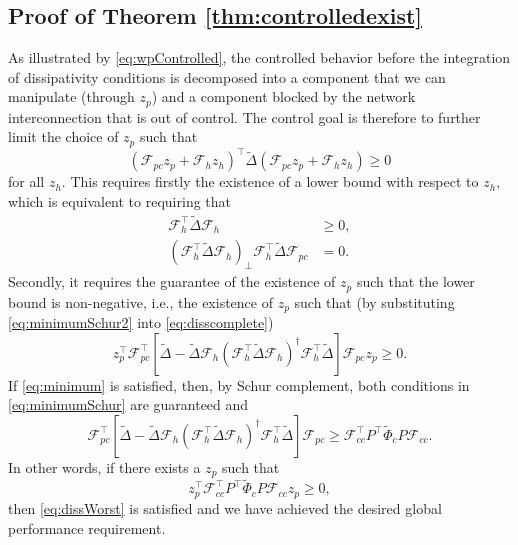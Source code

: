 \documentclass[11pt,print,draftcls,onecolumn,romanappendices]{ieeecolor}
\newcommand{\revise}[1]{{\color{black} #1}}
\newcommand{\F}{\mathcal{F}}
\begin{document}
\subsection{Proof of Theorem \ref{thm:controlledexist}}\label{appx:proofthm:controlledexist}
\revise{As illustrated by \eqref{eq:wpControlled}, the controlled behavior before the integration of dissipativity conditions is decomposed into a component that we can manipulate (through $z_p$) and a component blocked by the network interconnection that is out of control. The control goal is therefore to further limit the choice of $z_p$ such that
\begin{equation}\label{eq:disscomplete}
    (\F_{pc}z_p+\F_hz_h)^\top\widetilde{\Delta}(\F_{pc}z_p+\F_hz_h)\geq0
\end{equation}
for all $z_h$. This requires firstly the existence of a lower bound with respect to $z_h$, which is equivalent to requiring that
\begin{subequations}\label{eq:minimumSchur}
    \begin{align}
        \F_h^\top\widetilde{\Delta}\F_h&\geq0,\label{eq:minimumSchur1}\\
        (\F_h^\top\widetilde{\Delta}\F_h)_\perp\F_h^\top\widetilde{\Delta}\F_{pc}&=0.\label{eq:minimumSchur2}
    \end{align}
\end{subequations}
Secondly, it requires the guarantee of the existence of $z_p$ such that the lower bound is non-negative, i.e., the existence of $z_p$ such that (by substituting \eqref{eq:minimumSchur2} into \eqref{eq:disscomplete})
\begin{equation}\label{eq:dissWorst}
    z_p^\top\F_{pc}^\top\left[\widetilde{\Delta}-\widetilde{\Delta} \F_h\left(\F_h^\top \widetilde{\Delta} \F_h\right)^\dagger\F_h^\top \widetilde{\Delta}\right]\F_{pc}z_p\geq0.
\end{equation}
If \eqref{eq:minimum} is satisfied, then, by Schur complement, both conditions in \eqref{eq:minimumSchur} are guaranteed and
\begin{equation}
    \F_{pc}^\top\left[\widetilde{\Delta}-\widetilde{\Delta} \F_h\left(\F_h^\top \widetilde{\Delta} \F_h\right)^\dagger\F_h^\top \widetilde{\Delta}\right]\F_{pc}\geq\F_{cc}^\top P^\top\widetilde{\Phi}_cP\F_{cc}.
\end{equation}
In other words, if there exists a $z_p$ such that
\begin{equation}\label{eq:globalcontrolDiss}
    z_p^\top\F_{cc}^\top P^\top\widetilde{\Phi}_cP\F_{cc}z_p\geq0, 
\end{equation}
then \eqref{eq:dissWorst} is satisfied and we have achieved the desired global performance requirement.

}
\end{document}
